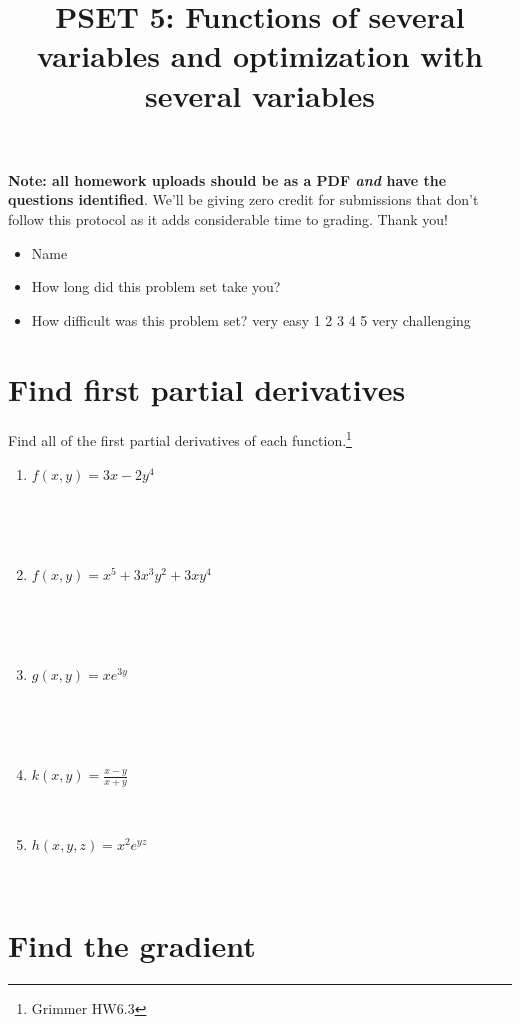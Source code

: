 \documentclass[
]{article}
\title{PSET 5: Functions of several variables and optimization with
several variables}
\author{}
\date{\vspace{-2.5em}}
\begin{document}
\maketitle

\textbf{Note: all homework uploads should be as a PDF \emph{and} have
the questions identified}. We'll be giving zero credit for submissions
that don't follow this protocol as it adds considerable time to grading.
Thank you!

\begin{itemize}
\item
  Name
\item
  How long did this problem set take you?
\item
  How difficult was this problem set? very easy 1 2 3 4 5 very
  challenging
\end{itemize}

\section{Find first partial
derivatives}\label{find-first-partial-derivatives}

Find all of the first partial derivatives of each function.\footnote{Grimmer
  HW6.3}

\begin{enumerate}
\def\labelenumi{\alph{enumi}.}
\item
  \(f(x,y) = 3x - 2y^4\)

  ~ ~\\
  \strut \\
\item
  \(f(x,y) = x^5 + 3x^3y^2 + 3xy^4\)

  ~ ~\\
  \strut \\
\item
  \(g(x,y) = xe^{3y}\)

  ~ ~\\
  \strut \\
\item
  \(k(x,y) = \frac{x-y}{x+y}\)

  ~\\
\item
  \(h(x,y,z) = x^2 e^{yz}\)

  ~\\
  \newpage
\end{enumerate}

\section{Find the gradient}\label{find-the-gradient}
\end{document}
